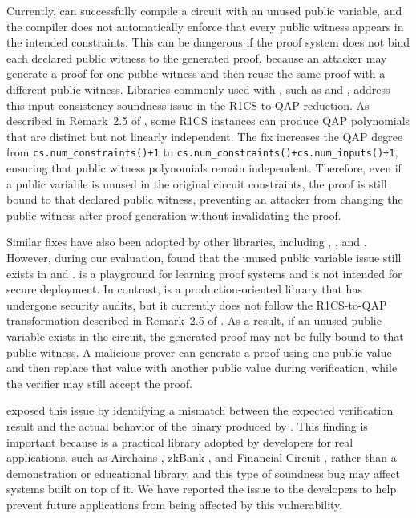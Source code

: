 Currently, \circom can successfully compile a circuit with an unused public variable, and the compiler does not automatically enforce that every public witness appears in the intended constraints. This can be dangerous if the proof system does not bind each declared public witness to the generated proof, because an attacker may generate a proof for one public witness and then reuse the same proof with a different public witness. Libraries commonly used with \circom, such as \snarkjs and \rapidsnark, address this input-consistency soundness issue in the R1CS-to-QAP reduction. As described in Remark~2.5 of \cite{ben2014succinct}, some R1CS instances can produce QAP polynomials that are distinct but not linearly independent. The fix increases the QAP degree from \texttt{cs.num\_constraints()+1} to \texttt{cs.num\_constraints()+cs.num\_inputs()+1}, ensuring that public witness polynomials remain independent. Therefore, even if a public variable is unused in the original circuit constraints, the proof is still bound to that declared public witness, preventing an attacker from changing the public witness after proof generation without invalidating the proof.

Similar fixes have also been adopted by other \zksnark libraries, including \libsnark, \bellman, and \arkworks. However, during our evaluation, \greyboxfuzz found that the unused public variable issue still exists in \playsnark and \gnark \cite{consensys_gnark}. \playsnark is a playground for learning \zksnark proof systems and is not intended for secure deployment. In contrast, \gnark is a production-oriented library that has undergone security audits, but it currently does not follow the R1CS-to-QAP transformation described in Remark~2.5 of \cite{ben2014succinct}. As a result, if an unused public variable exists in the circuit, the generated proof may not be fully bound to that public witness. A malicious prover can generate a proof using one public value and then replace that value with another public value during verification, while the verifier may still accept the proof.

\greyboxfuzz exposed this issue by identifying a mismatch between the expected verification result and the actual behavior of the \zksnark binary produced by \gnark. This finding is important because \gnark is a practical \zksnark library adopted by developers for real applications, such as Airchains \cite{airchains2024}, zkBank \cite{zkbank2024}, and Financial Circuit \cite{financialcircuit2025}, rather than a demonstration or educational library, and this type of soundness bug may affect systems built on top of it. We have reported the issue to the \gnark developers to help prevent future applications from being affected by this vulnerability.

